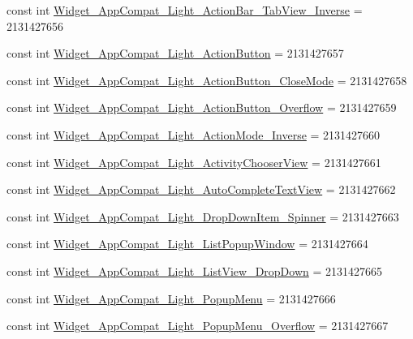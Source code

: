 \begin{CompactItemize}
\item 
const int \hyperlink{class__2doo_1_1_droid_1_1_resource_1_1_style_13b1e9793a5c5e93bc78fa9a4ddbaa88}{Widget\_\-AppCompat\_\-Light\_\-ActionBar\_\-TabView\_\-Inverse} = 2131427656
\item 
const int \hyperlink{class__2doo_1_1_droid_1_1_resource_1_1_style_d6c4d075940d92e423f66e09197f2660}{Widget\_\-AppCompat\_\-Light\_\-ActionButton} = 2131427657
\item 
const int \hyperlink{class__2doo_1_1_droid_1_1_resource_1_1_style_69df8fa996e98822a9cff5d18932a345}{Widget\_\-AppCompat\_\-Light\_\-ActionButton\_\-CloseMode} = 2131427658
\item 
const int \hyperlink{class__2doo_1_1_droid_1_1_resource_1_1_style_8c77d0106f25ed8fdce99382b22b6f62}{Widget\_\-AppCompat\_\-Light\_\-ActionButton\_\-Overflow} = 2131427659
\item 
const int \hyperlink{class__2doo_1_1_droid_1_1_resource_1_1_style_b2faa5a215fb589ae54e3cc04958efec}{Widget\_\-AppCompat\_\-Light\_\-ActionMode\_\-Inverse} = 2131427660
\item 
const int \hyperlink{class__2doo_1_1_droid_1_1_resource_1_1_style_df93204070d09d46f6f6343861eb3f10}{Widget\_\-AppCompat\_\-Light\_\-ActivityChooserView} = 2131427661
\item 
const int \hyperlink{class__2doo_1_1_droid_1_1_resource_1_1_style_9a3d4ecf4d6fc62c539b39cabafac599}{Widget\_\-AppCompat\_\-Light\_\-AutoCompleteTextView} = 2131427662
\item 
const int \hyperlink{class__2doo_1_1_droid_1_1_resource_1_1_style_73fcfbd1d600270861ca63749ef667b3}{Widget\_\-AppCompat\_\-Light\_\-DropDownItem\_\-Spinner} = 2131427663
\item 
const int \hyperlink{class__2doo_1_1_droid_1_1_resource_1_1_style_0cc39dd2893c31ab53a355bc89bc3ded}{Widget\_\-AppCompat\_\-Light\_\-ListPopupWindow} = 2131427664
\item 
const int \hyperlink{class__2doo_1_1_droid_1_1_resource_1_1_style_5b232957f959cdcb2b35703c9b67c444}{Widget\_\-AppCompat\_\-Light\_\-ListView\_\-DropDown} = 2131427665
\item 
const int \hyperlink{class__2doo_1_1_droid_1_1_resource_1_1_style_d17404229797e85125307f5302528b82}{Widget\_\-AppCompat\_\-Light\_\-PopupMenu} = 2131427666
\item 
const int \hyperlink{class__2doo_1_1_droid_1_1_resource_1_1_style_4dd4840a39d7c3490f409a4feac992b4}{Widget\_\-AppCompat\_\-Light\_\-PopupMenu\_\-Overflow} = 2131427667
\item 

\end{CompactItemize}

